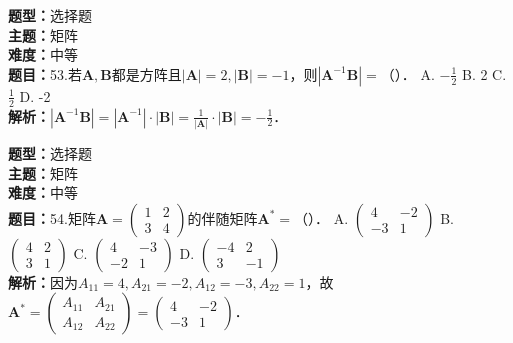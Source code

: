 \documentclass{ctexart}
\newenvironment{question}[5]{%
	\noindent\textbf{题型：}#1\\
	\textbf{主题：}#2\\
	\textbf{难度：}#3\\
	\textbf{题目：}#4\\
	\textbf{解析：}#5\\
	\vspace{1em}
}{}
\begin{document}
	\begin{question}
		{选择题}
		{矩阵}
		{中等}
		{53.若\(\mathbf{A}, \mathbf{B}\)都是方阵且\(|\mathbf{A}|=2,|\mathbf{B}|=-1\)，则\(\left|\mathbf{A}^{-1} \mathbf{B}\right|=\)（）．
			A. \(-\frac{1}{2}\)
			B. 2
			C. \(\frac{1}{2}\)
			D. -2}
		{\(\left|\mathbf{A}^{-1} \mathbf{B}\right|=\left|\mathbf{A}^{-1}\right| \cdot|\mathbf{B}|=\frac{1}{|\mathbf{A}|} \cdot|\mathbf{B}|=-\frac{1}{2}\)．}
	\end{question}
	
	\begin{question}
		{选择题}
		{矩阵}
		{中等}
		{54.矩阵\(\mathbf{A}=\left(\begin{array}{ll}1 & 2 \\ 3 & 4\end{array}\right)\)的伴随矩阵\(\mathbf{A}^*=\)（）．
			A. \(\left(\begin{array}{cc}4 & -2 \\ -3 & 1\end{array}\right)\)
			B. \(\left(\begin{array}{ll}4 & 2 \\ 3 & 1\end{array}\right)\)
			C. \(\left(\begin{array}{cc}4 & -3 \\ -2 & 1\end{array}\right)\)
			D. \(\left(\begin{array}{cc}-4 & 2 \\ 3 & -1\end{array}\right)\)}
		{因为\(A_{11}=4, A_{21}=-2, A_{12}=-3, A_{22}=1\)，故\(\mathbf{A}^*=\left(\begin{array}{cc}A_{11} & A_{21} \\ A_{12} & A_{22}\end{array}\right)=\left(\begin{array}{cc}4 & -2 \\ -3 & 1\end{array}\right)\)．}
	\end{question}
	
\end{document}
